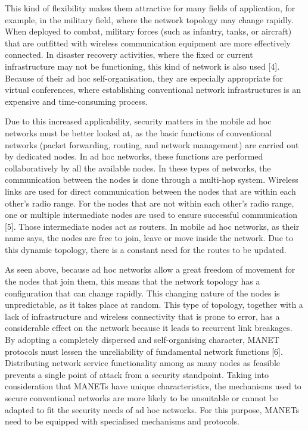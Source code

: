 \documentclass[10pt]{NSP1}
\begin{document}
This kind of flexibility makes them attractive for many fields of application, for example, in the military field, where the network topology may change rapidly. When deployed to combat, military forces (such as infantry, tanks, or aircraft) that are outfitted with wireless communication equipment are more effectively connected. In disaster recovery activities, where the fixed or current infrastructure may not be functioning, this kind of network is also used [4]. Because of their ad hoc self-organisation, they are especially appropriate for virtual conferences, where establishing conventional network infrastructures is an expensive and time-consuming process.

Due to this increased applicability, security matters in the mobile ad hoc networks must be better looked at, as the basic functions of conventional networks (packet forwarding, routing, and network management) are carried out by dedicated nodes. In ad hoc networks, these functions are performed collaboratively by all the available nodes. In these types of networks, the communication between the nodes is done through a multi-hop system. Wireless links are used for direct communication between the nodes that are within each other’s radio range. For the nodes that are not within each other’s radio range, one or multiple intermediate nodes are used to ensure successful communication [5]. Those intermediate nodes act as routers. In mobile ad hoc networks, as their name says, the nodes are free to join, leave or move inside the network. Due to this dynamic topology, there is a constant need for the routes to be updated.

As seen above, because ad hoc networks allow a great freedom of movement for the nodes that join them, this means that the network topology has a configuration that can change rapidly. This changing nature of the nodes is unpredictable, as it takes place at random. This type of topology, together with a lack of infrastructure and wireless connectivity that is prone to error, has a considerable effect on the network because it leads to recurrent link breakages. By adopting a completely dispersed and self-organising character, MANET protocols must lessen the unreliability of fundamental network functions [6]. Distributing network service functionality among as many nodes as feasible prevents a single point of attack from a security standpoint. Taking into consideration that MANETs have unique characteristics, the mechanisms used to secure conventional networks are more likely to be unsuitable or cannot be adapted to fit the security needs of ad hoc networks. For this purpose, MANETs need to be equipped with specialised mechanisms and protocols.
\end{document}
